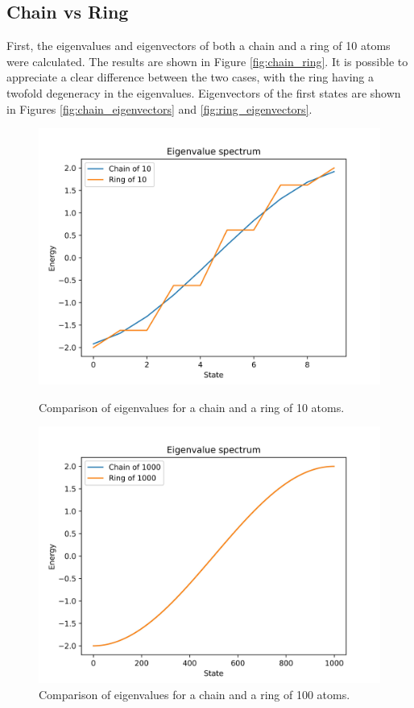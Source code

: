 \documentclass{article}
\begin{document}
\subsection{Chain vs Ring}
First, the eigenvalues and eigenvectors of both a chain and a ring of 10 atoms were calculated. The results are shown in Figure \ref{fig:chain_ring}. It is possible to appreciate a clear difference between the two cases, with the ring having a twofold degeneracy in the eigenvalues. Eigenvectors of the first states are shown in Figures \ref{fig:chain_eigenvectors} and \ref{fig:ring_eigenvectors}.

\begin{figure}[h]
    \centering
    \begin{minipage}{0.47\textwidth}
        \centering
        \includegraphics[width=\textwidth]{Figures/chain_vs_ring.jpg}
        \caption{Comparison of eigenvalues for a chain and a ring of 10 atoms.}
        \label{fig:chain_ring}
    \end{minipage}
    \hfill
    \begin{minipage}{0.47\textwidth}
        \centering
        \includegraphics[width=\textwidth]{Figures/convergence_limit.jpg}
        \caption{Comparison of eigenvalues for a chain and a ring of 100 atoms.}
        \label{fig:chain_vs_ring_infinite}
    \end{minipage}
\end{figure}
\end{document}
